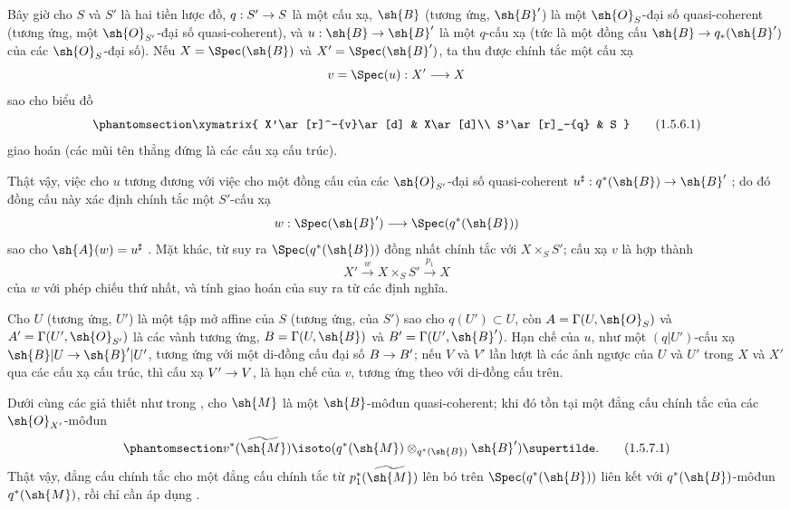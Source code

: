 \documentclass[oneside,10pt]{amsart}
\makeatletter
\newcommand{\ega@arrow}[2]{\mathchoice{#1}{#2}{#2}{#2}}
\renewcommand{\to}{\ega@arrow{\longrightarrow}{\rightarrow}}
\newcommand{\oldpage}[2][]{\marginnote{\normalfont\footnotesize\textbf{#1}~|~#2}\ignorespaces}
\let\EGAOriginalLabel\label
\renewcommand{\label}[1]{\phantomsection\EGAOriginalLabel{#1}}
\makeatother
\begin{document}
\begin{env}[1.5.6]
\label{II.1.5.6}
Bây giờ cho $S$ và $S'$ là hai tiền lược đồ, $q:S'\to S$ là một cấu xạ, $\sh{B}$ (tương ứng, $\sh{B}'$) là một $\sh{O}_S$-đại số quasi-coherent (tương ứng, một $\sh{O}_{S'}$-đại số quasi-coherent), và $u:\sh{B}\to\sh{B}'$ là một $q$-cấu xạ (tức là một đồng cấu $\sh{B}\to q_*(\sh{B}')$ của các $\sh{O}_S$-đại số).
Nếu $X=\Spec(\sh{B})$ và $X'=\Spec(\sh{B}')$, ta thu được chính tắc một cấu xạ
\[
  v=\Spec(u):X'\to X
\]
sao cho biểu đồ
\[
\label{II.1.5.6.1}
  \xymatrix{
    X'\ar[r]^-{v}\ar[d] & X\ar[d]\\
    S'\ar[r]_-{q} & S
  }
  \tag{1.5.6.1}
\]
giao hoán (các mũi tên thẳng đứng là các cấu xạ cấu trúc).

Thật vậy, việc cho $u$ tương đương với việc cho một đồng cấu của các $\sh{O}_{S'}$-đại số quasi-coherent $u^\sharp:q^*(\sh{B})\to\sh{B}'$ ; do đó đồng cấu này xác định chính tắc một $S'$-cấu xạ
\[
  w:\Spec(\sh{B}')\to\Spec(q^*(\sh{B}))
\]
sao cho $\sh{A}(w)=u^\sharp$ .
Mặt khác, từ  suy ra $\Spec(q^*(\sh{B}))$ đồng nhất chính tắc với $X\times_S S'$; cấu xạ $v$ là hợp thành
\[
  X'\xrightarrow{w}X\times_S S'\xrightarrow{p_1}X
\]
của $w$ với phép chiếu thứ nhất, và tính giao hoán của  suy ra từ các định nghĩa.

Cho $U$ (tương ứng, $U'$) là một tập mở affine của $S$ (tương ứng, của $S'$) sao cho $q(U')\subset U$, còn $A=\Gamma(U,\sh{O}_S)$ và $A'=\Gamma(U',\sh{O}_{S'})$ là các vành tương ứng, $B=\Gamma(U,\sh{B})$ và $B'=\Gamma(U',\sh{B}')$.
Hạn chế của $u$, như một $(q|U')$-cấu xạ $\sh{B}|U\to\sh{B}'|U'$, tương ứng với một di-đồng cấu đại số $B\to B'$; nếu $V$ và $V'$ lần lượt là các ảnh ngược của $U$ và $U'$ trong $X$ và $X'$ qua các cấu xạ cấu trúc, thì cấu xạ $V'\to V$, là hạn chế của $v$, tương ứng theo  với di-đồng cấu trên.
\end{env}

\begin{env}[1.5.7]
\label{II.1.5.7}
Dưới cùng các giả thiết như trong , cho $\sh{M}$ là một $\sh{B}$-môđun quasi-coherent; khi đó tồn tại một đẳng cấu chính tắc của các $\sh{O}_{X'}$-môđun
\[
\label{II.1.5.7.1}
  v^*(\widetilde{\sh{M}})
  \isoto
  (q^*(\sh{M})\otimes_{q^*(\sh{B})}\sh{B}')\supertilde.
  \tag{1.5.7.1}
\]
\oldpage[II]{14}
Thật vậy, đẳng cấu chính tắc  cho một đẳng cấu chính tắc từ $p_1^*(\widetilde{\sh{M}})$ lên bó trên $\Spec(q^*(\sh{B}))$ liên kết với $q^*(\sh{B})$-môđun $q^*(\sh{M})$, rồi chỉ cần áp dụng .
\end{env}
\end{document}
